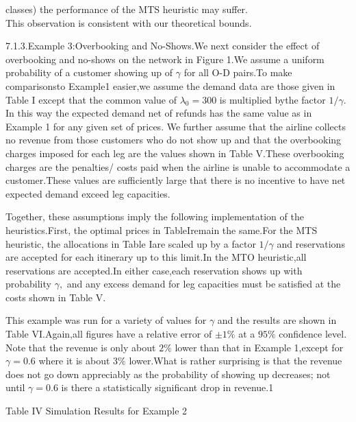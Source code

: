 classes) the performance of the MTS heuristic may suffer.\\
This observation is consistent with our theoretical bounds.

7.1.3.Example 3:Overbooking and No-Shows.We next consider the effect of
overbooking and no-shows on the network in Figure 1.We assume a uniform
probability of a customer showing up of \(\gamma\) for all O-D pairs.To
make comparisonsto Example1 easier,we assume the demand data are those
given in Table I except that the common value of
\(\lambda _ { 0 } = 3 0 0\) is multiplied bythe factor \(1 / \gamma .\)
In this way the expected demand net of refunds has the same value as in
Example 1 for any given set of prices. We further assume that the
airline collects no revenue from those customers who do not show up and
that the overbooking charges imposed for each leg are the values shown
in Table V.These overbooking charges are the penalties/ costs paid when
the airline is unable to accommodate a customer.These values are
sufficiently large that there is no incentive to have net expected
demand exceed leg capacities.

Together, these assumptions imply the following implementation of the
heuristics.First, the optimal prices in TableIremain the same.For the
MTS heuristic, the allocations in Table Iare scaled up by a factor
\(1 / \gamma\) and reservations are accepted for each itinerary up to
this limit.In the MTO heuristic,all reservations are accepted.In either
case,each reservation shows up with probability \(\gamma ,\) and any
excess demand for leg capacities must be satisfied at the costs shown in
Table V.

This example was run for a variety of values for \(\gamma\) and the
results are shown in Table VI.Again,all figures have a relative error of
\(\pm 1 \%\) at a \(9 5 \%\) confidence level. Note that the revenue is
only about \(2 \%\) lower than that in Example 1,except for
\(\gamma = 0 . 6\) where it is about \(3 \%\) lower.What is rather
surprising is that the revenue does not go down appreciably as the
probability of showing up decreases; not until \(\gamma = 0 . 6\) is
there a statistically significant drop in revenue.1

Table IV Simulation Results for Example 2

